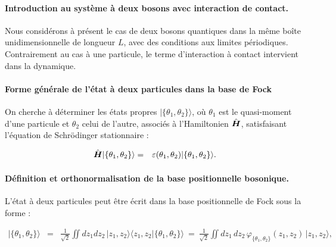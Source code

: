 \paragraph{Introduction au système à deux bosons avec interaction de contact.}

Nous considérons à présent le cas de deux bosons quantiques dans la même boîte unidimensionnelle de longueur \(L\), avec des conditions aux limites périodiques. Contrairement au cas à une particule, le terme d’interaction à contact intervient dans la dynamique.
\paragraph{Forme générale de l’état à deux particules dans la base de Fock}
On cherche à déterminer les états propres \(\vert \{\theta_1, \theta_2\} \rangle\), où $\theta_1$ est le quasi-moment d'une particule et $\theta_2$ celui de l'autre, associés à l'Hamiltonien \(\hat{\bm{H}}\), satisfaisant l’équation de Schrödinger stationnaire :

\begin{eqnarray}
	\hat{\bm{H}} \vert \{\theta_1, \theta_2\} \rangle & = & \varepsilon(\theta_1 , \theta_2 ) \vert \{\theta_1, \theta_2\} \rangle.
\end{eqnarray}

\paragraph{Définition et orthonormalisation de la base positionnelle bosonique.}
L’état à deux particules peut être écrit dans la base positionnelle de Fock sous la forme :


\begin{eqnarray}
	\vert \{\theta_1, \theta_2\} \rangle & = & \frac{1}{\sqrt{2}}\iint dz_1dz_2 \, \vert z_1 , z_2 \rangle \langle z_1 , z_2  \vert \{\theta_1, \theta_2\}  \rangle ~=~\frac{1}{\sqrt{2}} \iint dz_1\,dz_2 \, \varphi_{\{\theta_1 , \theta_2\}}(z_1, z_2) \, \vert z_1 , z_2 \rangle , \label{chap:1:2.part}
\end{eqnarray}

